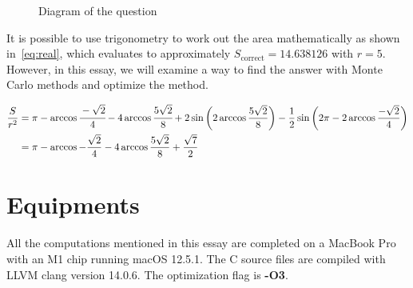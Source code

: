 \documentclass[a4paper]{article}
\begin{document}
\begin{figure}[hp]
\centering
{}
\caption{Diagram of the question}\label{fig:question}
\end{figure}

It is possible to use trigonometry to work out the area mathematically as shown in~\eqref{eq:real}, which evaluates to approximately \(S_\text{correct} = 14.638126\) with \(r = 5\). However, in this essay, we will examine a way to find the answer with Monte Carlo methods and optimize the method.

\begin{align}\label{eq:real}
    \frac{S}{r^2} &=
        \pi - \arccos\cfrac{-\sqrt{2}}{4} 
            - 4\arccos\cfrac{5\sqrt{2}}{8}
            + 2\sin\left(2\arccos\frac{5\sqrt{2}}{8}\right)
            - \frac{1}{2}\sin\left(
                2\pi - 2\arccos\frac{-\sqrt{2}}{4}
            \right) \notag \\
    &= \pi - \arccos -\frac{\sqrt{2}}{4}
        - 4 \arccos\frac{5\sqrt{2}}{8}
        + \frac{\sqrt{7}}{2}
\end{align}

\section{Equipments}
All the computations mentioned in this essay are completed on a MacBook Pro with an M1 chip running macOS 12.5.1. The C source files are compiled with LLVM clang version 14.0.6. The optimization flag is \textbf{-O3}.
\end{document}
